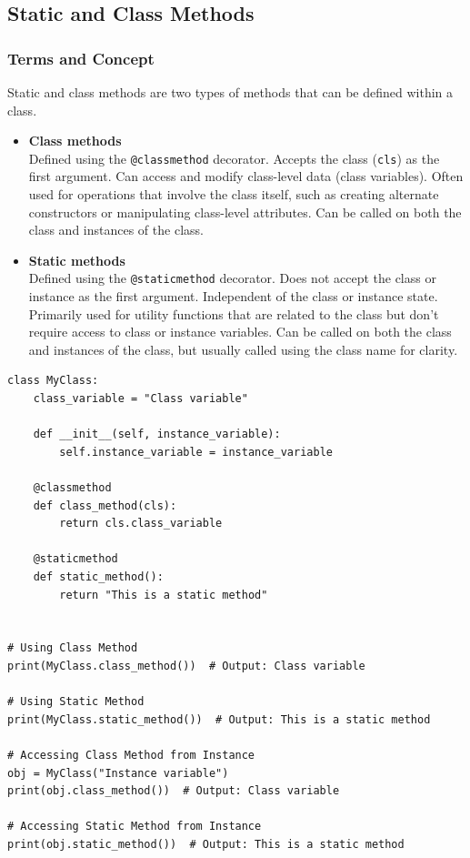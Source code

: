 \newpage
\subsection{Static and Class Methods}
\subsubsection{Terms and Concept}
Static and class methods are two types of methods that can be defined within a class. 
\begin{itemize}
\item \textbf{Class methods}\\
Defined using the \texttt{@classmethod} decorator.
Accepts the class (\texttt{cls}) as the first argument.
Can access and modify class-level data (class variables).
Often used for operations that involve the class itself, such as creating alternate constructors or manipulating class-level attributes. Can be called on both the class and instances of the class.

\item \textbf{Static methods}\\
Defined using the \texttt{@staticmethod} decorator.
Does not accept the class or instance as the first argument.
Independent of the class or instance state.
Primarily used for utility functions that are related to the class but don't require access to class or instance variables.
Can be called on both the class and instances of the class, but usually called using the class name for clarity.
\end{itemize}

\begin{codebox}
\begin{verbatim}
class MyClass:
    class_variable = "Class variable"

    def __init__(self, instance_variable):
        self.instance_variable = instance_variable

    @classmethod
    def class_method(cls):
        return cls.class_variable

    @staticmethod
    def static_method():
        return "This is a static method"


# Using Class Method
print(MyClass.class_method())  # Output: Class variable

# Using Static Method
print(MyClass.static_method())  # Output: This is a static method

# Accessing Class Method from Instance
obj = MyClass("Instance variable")
print(obj.class_method())  # Output: Class variable

# Accessing Static Method from Instance
print(obj.static_method())  # Output: This is a static method
\end{verbatim}
\end{codebox}



